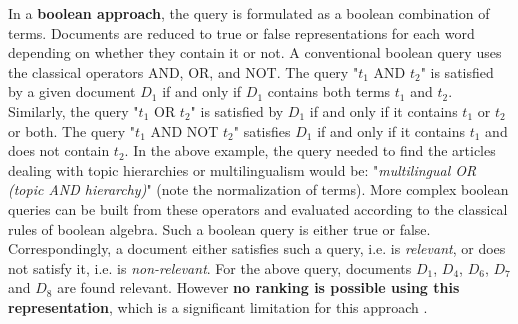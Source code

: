 In a \textbf{boolean approach}, the query is formulated as a boolean combination of terms. Documents are reduced to true or false representations for each word depending on whether they contain it or not. A conventional boolean query uses the classical operators AND, OR, and NOT. The query "$t_1$ AND $t_2$" is satisfied by a given document $D_1$ if and only if $D_1$ contains both terms $t_1$ and $t_2$. Similarly, the query "$t_1$ OR $t_2$" is satisfied by $D_1$ if and only if it contains $t_1$ or $t_2$ or both. The query "$t_1$ AND NOT $t_2$" satisfies $D_1$ if and only if it contains $t_1$ and does not contain $t_2$. In the above example, the query needed to find the articles dealing with topic hierarchies or multilingualism would be: "\textit{multilingual OR (topic AND hierarchy)}" (note the normalization of terms). More complex boolean queries can be built from these operators and evaluated according to the classical rules of boolean algebra. Such a boolean query is either true or false. Correspondingly, a document either satisfies such a query, i.e. is \textit{relevant}, or does not satisfy it, i.e. is \textit{non-relevant}. For the above query, documents $D_1$, $D_4$, $D_6$, $D_7$ and $D_8$ are found relevant. However \textbf{no ranking is possible using this representation}, which is a significant limitation for this approach \citep{harmon1995}. 

